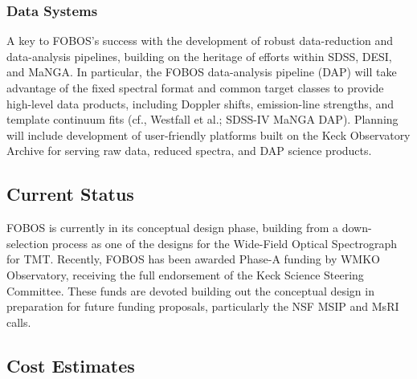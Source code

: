 \subsubsection{Data Systems} A key to FOBOS's success with the
development of robust data-reduction and data-analysis pipelines,
building on the heritage of efforts within SDSS, DESI, and MaNGA. In
particular, the FOBOS data-analysis pipeline (DAP) will take
advantage of the fixed spectral format and common target classes to
provide high-level data products, including Doppler shifts,
emission-line strengths, and template continuum fits (cf., Westfall
et al.; SDSS-IV MaNGA DAP). Planning will include development of
user-friendly platforms built on the Keck Observatory Archive for
serving raw data, reduced spectra, and DAP science products.


\subsection{Current Status} FOBOS is currently in its conceptual
design phase, building from a down-selection process as one of the
designs for the Wide-Field Optical Spectrograph for TMT. Recently,
FOBOS has been awarded Phase-A funding by WMKO Observatory, receiving
the full endorsement of the Keck Science Steering Committee. These
funds are devoted building out the conceptual design in preparation
for future funding proposals, particularly the NSF MSIP and MsRI
calls.

\subsection{Cost Estimates} 



